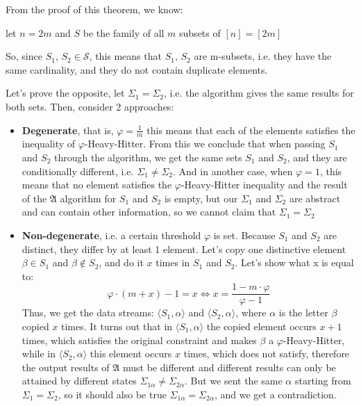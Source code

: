 \documentclass{article}
\let\phi\varphi
\begin{document}
  From the proof of this theorem, we know:
  \begin{center}
      let $n =2m$ and $S$ be the family of all $m$ subsets of $[n] = [2m]$
  \end{center}

  So, since $S_1,\,S_2\in \mathcal{S}$, this means that $S_1,\, S_2$ are m-subsets, i.e. they have the same cardinality, and they do not contain duplicate elements.

  Let's prove the opposite, let $\Sigma_1 = \Sigma_2$, i.e. the algorithm gives the same results for both sets. Then, consider 2 approaches:
  \begin{itemize}
      \item\textbf{Degenerate}, that is, $\phi = \frac{1}{m}$ this means that each of the elements satisfies the inequality of $\phi$-Heavy-Hitter. From this we conclude that when passing $S_1$ and $S_2$ through the algorithm, we get the same sets $S_1$ and $S_2$, and they are conditionally different, i.e. $\Sigma_1\neq\Sigma_2$. And in another case, when $\phi = 1$, this means that no element satisfies the $\phi$-Heavy-Hitter inequality and the result of the $\mathfrak{A}$ algorithm for $S_1$ and $S_2$ is empty, but our $\Sigma_1$ and $\Sigma_2$ are abstract and can contain other information, so we cannot claim that $\Sigma_1 = \Sigma_2$

      \item\textbf{Non-degenerate}, i.e. a certain threshold $\phi$ is set. Because $S_1$ and $S_2$ are distinct, they differ by at least 1 element. Let's copy one distinctive element $\beta\in S_1$ and $\beta\notin S_2$, and do it $x$ times in $S_1$ and $S_2$. Let's show what x is equal to:
      \[\phi \cdot (m + x) - 1 = x \iff x = \frac{1 - m \cdot \phi}{\phi - 1}\]
      Thus, we get the data streams: $\langle S_1, \alpha \rangle$ and $\langle S_2, \alpha \rangle$, where $\alpha$ is the letter $\beta$ copied $x$ times. It turns out that in $\langle S_1, \alpha \rangle$ the copied element occurs $x + 1$ times, which satisfies the original constraint and makes $\beta$ a $\phi$-Heavy-Hitter, while in $\langle S_2, \alpha \rangle$ this element occurs $x$ times, which does not satisfy, therefore the output results of $\mathfrak{A}$ must be different and different results can only be attained by different states $\Sigma_{1\alpha}\neq \Sigma_{2\alpha}$. But we sent the same $\alpha$ starting from $\Sigma_{1} = \Sigma_{2}$, so it should also be true $\Sigma_{1\alpha} = \Sigma_{2\alpha}$, and we get a contradiction.
  \end{itemize}
\end{document}
